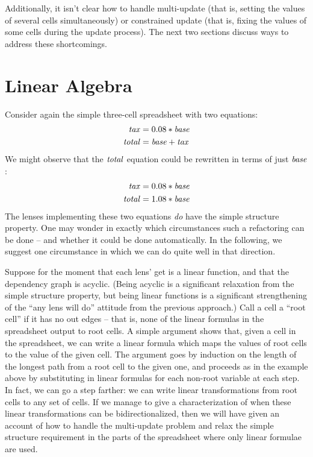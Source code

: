 \documentclass{article}
\begin{document}
Additionally, it isn't clear how to handle multi-update (that is, setting
the values of several cells simultaneously) or constrained update (that is,
fixing the values of some cells during the update process). The next two
sections discuss ways to address these shortcomings.

\section{Linear Algebra}
Consider again the simple three-cell spreadsheet with two equations:
\begin{align*}
    \mathit{tax} &= 0.08*\mathit{base} \\
    \mathit{total} &= \mathit{base}+\mathit{tax}
\end{align*}
We might observe that the $\mathit{total}$ equation could be rewritten in terms of
just $\mathit{base}$:
\begin{align*}
    \mathit{tax}   &= 0.08*\mathit{base} \\
    \mathit{total} &= 1.08*\mathit{base}
\end{align*}
The lenses implementing these two equations \emph{do} have the simple
structure property. One may wonder in exactly which circumstances such a
refactoring can be done -- and whether it could be done automatically. In
the following, we suggest one circumstance in which we can do quite well in
that direction.

Suppose for the moment that each lens' get is a linear function, and that
the dependency graph is acyclic. (Being acyclic is a significant relaxation
from the simple structure property, but being linear functions is a
significant strengthening of the ``any lens will do'' attitude from the
previous approach.) Call a cell a ``root cell'' if it has no out edges --
that is, none of the linear formulas in the spreadsheet output to root
cells. A simple argument shows that, given a cell in the spreadsheet, we
can write a linear formula which maps the values of root cells to the value
of the given cell. The argument goes by induction on the length of the
longest path from a root cell to the given one, and proceeds as in the
example above by substituting in linear formulas for each non-root variable
at each step. In fact, we can go a step farther: we can write linear
transformations from root cells to any set of cells. If we manage to give a
characterization of when these linear transformations can be
bidirectionalized, then we will have given an account of how to handle the
multi-update problem and relax the simple structure requirement in the parts
of the spreadsheet where only linear formulae are used.
\end{document}
